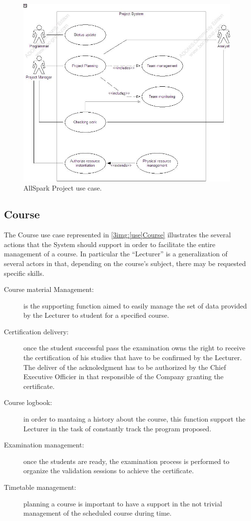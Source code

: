 \begin{figure}
\begin{centering}
\includegraphics[scale=0.45]{assign3/adonis/imgs/project.jpg}
\caption{AllSpark Project use case.}
\label{3img:[use]project}
\end{centering}
\end{figure}

\subsection{Course}
The Course use case represented in \ref{3img:[use]Course} illustrates the several actions that the System should support in order to facilitate the entire management of a course. In particular the ``Lecturer'' is a generalization of several actors in that, depending on the course's subject, there may be requested specific skills.
\begin{description}
 \item[Course material Management:] is the supporting function aimed to easily manage the set of data provided by the Lecturer to student for a specified course.
 \item[Certification delivery:] once the student successful pass the examination owns the right to receive the certification of his studies that have to be confirmed by the Lecturer. The deliver of the acknoledgment has to be authorized by the Chief Executive Officier in that responsible of the Company granting the certificate.
 \item[Course logbook:] in order to mantaing a history about the course, this function support the Lecturer in the task of constantly track the program proposed.
 \item[Examination management:] once the students are ready, the examination process is performed to organize the validation sessions to achieve the certificate.
 \item[Timetable management:] planning a course is important to have a support in the not trivial management of the scheduled course during time.
\end{description}

